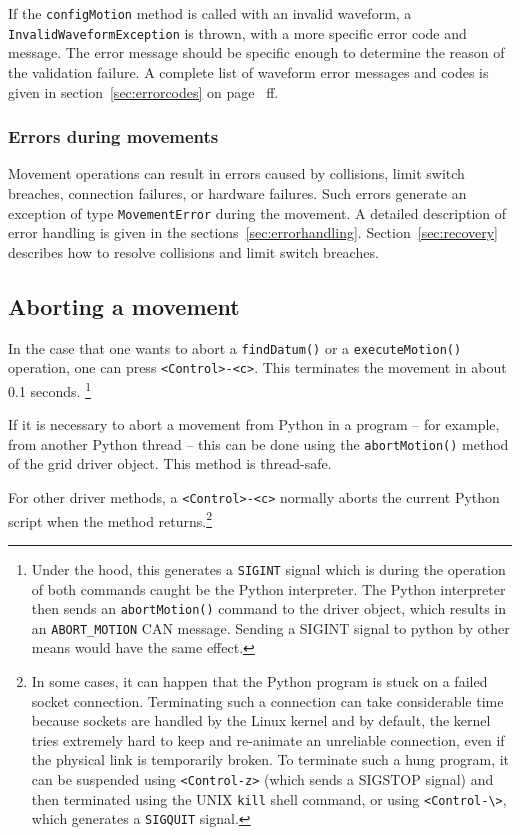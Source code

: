 \documentclass[11pt,a4paper]{scrartcl}
\begin{document}
\begin{sloppypar}
If the \texttt{configMotion} method is called with an invalid
waveform, a \texttt{InvalidWaveformException} is thrown, with a more
specific error code and message. The error message should be specific
enough to determine the reason of the validation failure.  A complete
list of waveform error messages and codes is given in
section~\ref{sec:errorcodes} on page~\pageref{sec:errorcodes} ff.
\end{sloppypar}

\subsubsection{Errors during movements}
Movement operations can result in errors caused by collisions, limit
switch breaches, connection failures, or hardware failures. Such
errors generate an exception of type \texttt{MovementError} during the
movement. A detailed description of error handling is given in the
sections~\ref{sec:errorhandling}. Section~\ref{sec:recovery} describes
how to resolve collisions and limit switch breaches.





\subsection{Aborting a movement}
  In the case
that one wants to abort a \texttt{findDatum()} or a
\texttt{executeMotion()} operation, one can press
\verb+<Control>-<c>+. This terminates the movement in about 0.1
seconds. \footnote{Under the hood, this generates a \texttt{SIGINT}
  signal which is during the operation of both commands caught be the
  Python interpreter. The Python interpreter then sends an
  \texttt{abortMotion()} command to the driver object, which results
  in an \texttt{ABORT\_MOTION} CAN message. Sending a SIGINT signal to
  python by other means would have the same effect.}

If it is necessary to abort a movement from Python in a program -- for
example, from another Python thread -- this can be done using the
\texttt{abortMotion()} method of the grid driver object.  This method
is thread-safe.

For other driver methods, a \verb+<Control>-<c>+ normally aborts the
current Python script when the method returns.\footnote{
  In some cases, it
  can happen that the Python program is stuck on a failed socket
  connection. Terminating such a connection can take considerable time
  because sockets are handled by the Linux kernel and by default, the
  kernel tries extremely hard to keep and re-animate an unreliable
  connection, even if the physical link is temporarily broken. To
  terminate such a hung program, it can be suspended using
  \texttt{<Control-z>} (which sends a SIGSTOP signal) and then
  terminated using the UNIX \texttt{kill} shell command, or using
  \texttt{<Control-\textbackslash>}, which generates a
  \texttt{SIGQUIT} signal.}
\end{document}

